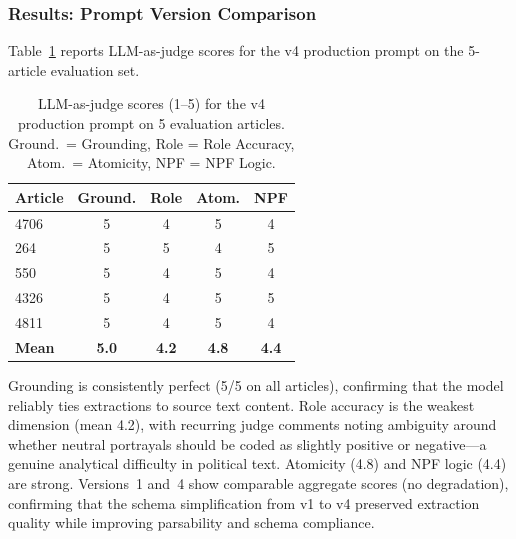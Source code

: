 \documentclass[10pt, a4paper]{article}
\begin{document}
\subsubsection{Results: Prompt Version Comparison}
\label{sec:results_prompt}

Table~\ref{tab:judge_v4} reports LLM-as-judge scores for the v4 production prompt on the 5-article evaluation set.

\begin{table}[!ht]
\begin{center}
\begin{tabular}{lcccc}
  \hline
  \textbf{Article} & \textbf{Ground.} & \textbf{Role} & \textbf{Atom.} & \textbf{NPF} \\
  \hline
  4706  & 5 & 4 & 5 & 4 \\
  264   & 5 & 5 & 4 & 5 \\
  550   & 5 & 4 & 5 & 4 \\
  4326  & 5 & 4 & 5 & 5 \\
  4811  & 5 & 4 & 5 & 4 \\
  \hline
  \textbf{Mean} & \textbf{5.0} & \textbf{4.2} & \textbf{4.8} & \textbf{4.4} \\
  \hline
\end{tabular}
\caption{LLM-as-judge scores (1--5) for the v4 production prompt on 5 evaluation articles. Ground.\ = Grounding, Role = Role Accuracy, Atom.\ = Atomicity, NPF = NPF Logic.}
\label{tab:judge_v4}
\end{center}
\end{table}

Grounding is consistently perfect (5/5 on all articles), confirming that the model reliably ties extractions to source text content. Role accuracy is the weakest dimension (mean 4.2), with recurring judge comments noting ambiguity around whether neutral portrayals should be coded as slightly positive or negative---a genuine analytical difficulty in political text. Atomicity (4.8) and NPF logic (4.4) are strong. Versions~1 and~4 show comparable aggregate scores (no degradation), confirming that the schema simplification from v1 to v4 preserved extraction quality while improving parsability and schema compliance.
\end{document}
